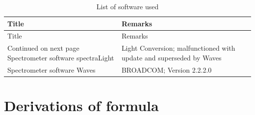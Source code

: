 \documentclass[twoside,openright]{scrreprt}
\begin{document}
{\begin{longtable}{p{}p{}}
    \caption{List of software used}
    \label{tab:devices} \\
    \toprule 
    Title & Remarks \\
    \midrule
    \endfirsthead
    \toprule 
    Title & Remarks \\
    \midrule
    \endhead
    \midrule
    Continued on next page
    \endfoot
    \bottomrule
    \endlastfoot
    Spectrometer software spectraLight & Light Conversion; malfunctioned with update and superseded by Waves \\
    Spectrometer software Waves & BROADCOM; Version 2.2.2.0\\
\end{longtable}

\chapter{Derivations of formula}
}
\end{document}
